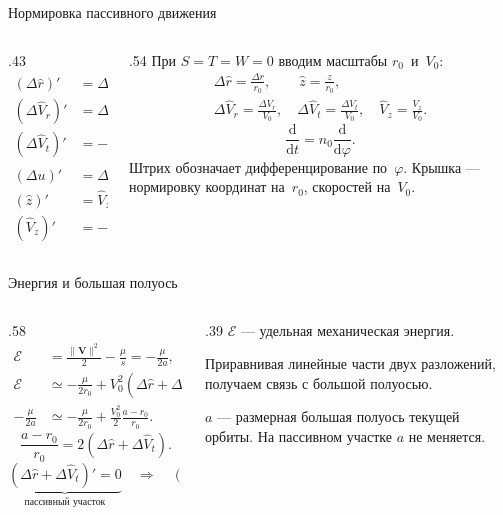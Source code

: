 \documentclass[11pt,aspectratio=169,t]{beamer}
\newcommand{\eqcompact}{\fontsize{10}{12}\selectfont}
\newcommand{\dvr}{\Delta\widehat V_r}
\newcommand{\dvt}{\Delta\widehat V_t}
\newcommand{\drh}{\Delta\widehat r}
\newcommand{\vz}{\widehat V_z}
\newcommand{\zh}{\widehat z}
\begin{document}
\begin{frame}{Нормировка пассивного движения}
\relax
\begin{columns}[T,onlytextwidth]
\begin{column}{.43\textwidth}
{\derivationmathspacing
\[
\boxed{\begin{aligned}
 (\drh)'&=\dvr,\\[5pt]
 (\dvr)'&=\drh+2\dvt,\\[5pt]
 (\dvt)'&=-\dvr,\\[5pt]
 (\Delta u)'&=\dvt-\drh,\\[5pt]
 (\zh)'&=\vz,\\[5pt]
 (\vz)'&=-\zh.
\end{aligned}}
\]
}
\end{column}
\begin{column}{.54\textwidth}
При $S=T=W=0$ вводим масштабы \mbox{$r_0$ и $V_0$}:
{\derivationmathspacing
\[
\begin{gathered}
 \drh=\frac{\Delta r}{r_0},\qquad \zh=\frac{z}{r_0},\\[5pt]
 \dvr=\frac{\Delta V_r}{V_0},\quad
 \dvt=\frac{\Delta V_t}{V_0},\quad
 \vz=\frac{V_z}{V_0}.
\end{gathered}
\]
\[
 \frac{\mathrm d}{\mathrm dt}=n_0\frac{\mathrm d}{\mathrm d\varphi}.
\]
}
\RaggedRight
Штрих обозначает дифференцирование по~$\varphi$. Крышка — нормировку координат на~$r_0$, скоростей на~$V_0$.
\end{column}
\end{columns}
\end{frame}

\begin{frame}{Энергия и большая полуось}
\relax
\begin{columns}[T,onlytextwidth]
\begin{column}{.58\textwidth}
{\eqcompact\derivationmathspacing
\[
\begin{aligned}
 \mathcal E&=\frac{\|\boldsymbol V\|^2}{2}-\frac{\mu}{s}
                =-\frac{\mu}{2a},\\[5pt]
 \mathcal E&\simeq-\frac{\mu}{2r_0}+V_0^2(\drh+\dvt),\\[5pt]
 -\frac{\mu}{2a}&\simeq-\frac{\mu}{2r_0}
             +\frac{V_0^2}{2}\frac{a-r_0}{r_0}.
\end{aligned}
\]
\[
 \boxed{\frac{a-r_0}{r_0}=2(\drh+\dvt).}
\]
\[
 \underbrace{(\drh+\dvt)'=0}_{\text{пассивный участок}}
 \quad\Longrightarrow\quad
 (\drh)''+\drh=\frac{a-r_0}{r_0}.
\]
}
\end{column}
\begin{column}{.39\textwidth}
\RaggedRight
$\mathcal E$ — удельная механическая энергия.\par\medskip
Приравнивая линейные части двух разложений, получаем связь с большой полуосью.\par\medskip
$a$ — размерная большая полуось текущей орбиты. На пассивном участке $a$ не меняется.
\end{column}
\end{columns}
\end{frame}
\end{document}
